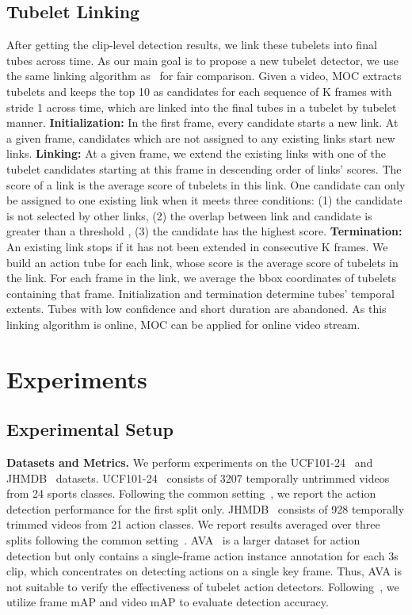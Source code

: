 \documentclass[runningheads]{llncs}
\begin{document}
\subsection{Tubelet Linking}\label{link}
After getting the clip-level detection results, we link these tubelets into final tubes across time. As our main goal is to propose a new tubelet detector, we use the same linking algorithm as~\cite{kalogeiton2017action} for fair comparison. Given a video, MOC extracts tubelets and keeps the top 10 as candidates for each sequence of K frames with stride 1 across time, which are linked into the final tubes in a tubelet by tubelet manner. \textbf{Initialization:} In the first frame, every candidate starts a new link. At a given frame, candidates which are not assigned to any existing links start new links. \textbf{Linking:} At a given frame, we extend the existing links with one of the tubelet candidates starting at this frame in descending order of links' scores. The score of a link is the average score of tubelets in this link. One candidate can only be assigned to one existing link when it meets three conditions: (1) the candidate is not selected by other links, (2) the overlap between link and candidate is greater than a threshold , (3) the candidate  has the highest score. \textbf{Termination:} An existing link stops if it has not been extended in consecutive K frames. We build an action tube for each link, whose score is the average score of tubelets in the link. For each frame in the link, we average the bbox coordinates of tubelets containing that frame. Initialization and termination determine tubes' temporal extents. Tubes with low confidence and short duration are abandoned. As this linking algorithm is online, MOC can be applied for online video stream.

\section{Experiments}

\subsection{Experimental Setup}\label{Implementation details}
{\bf Datasets and Metrics.} We perform experiments on the UCF101-24~\cite{UCF101} and JHMDB~\cite{JHMDB} datasets. UCF101-24~\cite{UCF101} consists of 3207 temporally untrimmed videos from 24 sports classes. Following the common setting~\cite{peng2016multi,kalogeiton2017action}, we report the action detection performance for the first split only. JHMDB~\cite{JHMDB} consists of 928 temporally trimmed videos from 21 action classes. We report results averaged over three splits following the common setting~\cite{peng2016multi,kalogeiton2017action}. AVA~\cite{gu2018ava} is a larger dataset for action detection but only contains a single-frame action instance annotation for each 3s clip, which concentrates on detecting actions on a single key frame. Thus, AVA is not suitable to verify the effectiveness of tubelet action detectors. Following~\cite{weinzaepfel2015learning,gkioxari2015finding,kalogeiton2017action}, we utilize frame mAP and video mAP to evaluate detection accuracy.
\end{document}
